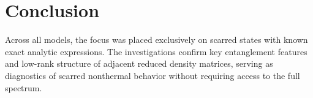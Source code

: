 \documentclass[11pt]{article}
\begin{document}
\vspace{0.5cm}
\pagebreak
\section*{Conclusion}

Across all models, the focus was placed exclusively on scarred states with known exact analytic expressions. The investigations confirm key entanglement features and low-rank structure of adjacent reduced density matrices, serving as diagnostics of scarred nonthermal behavior without requiring access to the full spectrum.
\end{document}
